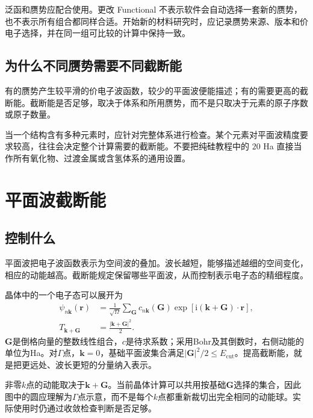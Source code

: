 泛函和赝势应配合使用。更改 Functional 不表示软件会自动选择一套新的赝势，也不表示所有组合都同样合适。开始新的材料研究时，应记录赝势来源、版本和价电子选择，并在同一组可比较的计算中保持一致。

\subsection{为什么不同赝势需要不同截断能}

有的赝势产生较平滑的价电子波函数，较少的平面波便能描述；有的需要更高的截断能。截断能是否足够，取决于体系和所用赝势，而不是只取决于元素的原子序数或原子数量。

当一个结构含有多种元素时，应针对完整体系进行检查。某个元素对平面波精度要求较高，往往会决定整个计算需要的截断能。不要把纯硅教程中的 $20$ Ha 直接当作所有氧化物、过渡金属或含氢体系的通用设置。

\section{平面波截断能}

\subsection{ 控制什么}

平面波把电子波函数表示为空间波的叠加。波长越短，能够描述越细的空间变化，相应的动能越高。截断能规定保留哪些平面波，从而控制表示电子态的精细程度。


晶体中的一个电子态可以展开为
\begin{equation}
  \begin{aligned}
  \psi_{n\mathbf k}(\mathbf r)
   &=\frac{1}{\sqrt{\Omega}}\sum_{\mathbf G}
      c_{n\mathbf k}(\mathbf G)
      \exp\!\left[\mathrm i(\mathbf k+\mathbf G)\cdot\mathbf r\right],\\
  T_{\mathbf k+\mathbf G}&=\frac{|\mathbf k+\mathbf G|^2}{2}.
  \end{aligned}
  \label{eq:plane-wave-expansion}
\end{equation}
$\mathbf G$是倒格向量的整数线性组合，$c$是待求系数；采用Bohr及其倒数时，右侧动能的单位为Ha。对$\Gamma$点，$\mathbf k=0$，基础平面波集合满足$|\mathbf G|^2/2\leq E_{\mathrm{cut}}$。提高截断能，就是把更远处、波长更短的分量纳入表示。



非零$k$点的动能取决于$\mathbf k+\mathbf G$。当前晶体计算可以共用按基础$\mathbf G$选择的集合，因此图中的圆应理解为$\Gamma$点示意，而不是每个$k$点都重新裁切出完全相同的动能球。实际使用时仍通过收敛检查判断是否足够。

